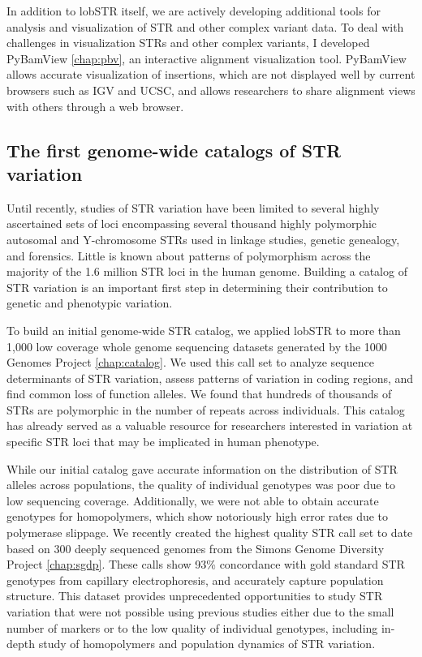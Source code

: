 In addition to lobSTR itself, we are actively developing additional tools for analysis and visualization of STR and other complex variant data. To deal with challenges in visualization STRs and other complex variants, I developed PyBamView \cite{Gymrek2014} \autoref{chap:pbv}, an interactive alignment visualization tool. PyBamView allows accurate visualization of insertions, which are not displayed well by current browsers such as IGV and UCSC, and allows researchers to share alignment views with others through a web browser.

\subsection{The first genome-wide catalogs of STR variation}
Until recently, studies of STR variation have been limited to several highly ascertained sets of loci encompassing several thousand highly polymorphic autosomal and Y-chromosome STRs used in linkage studies, genetic genealogy, and forensics. Little is known about patterns of polymorphism across the majority of the 1.6 million STR loci in the human genome. Building a catalog of STR variation is an important first step in determining their contribution to genetic and phenotypic variation.

To build an initial genome-wide STR catalog, we applied lobSTR to more than 1,000 low coverage whole genome sequencing datasets generated by the 1000 Genomes Project \cite{WillemsGymrekHighnamEtAl2014} \autoref{chap:catalog}. We used this call set to analyze sequence determinants of STR variation, assess patterns of variation in coding regions, and find common loss of function alleles. We found that hundreds of thousands of STRs are polymorphic in the number of repeats across individuals. This catalog has already served as a valuable resource for researchers interested in variation at specific STR loci that may be implicated in human phenotype. 

While our initial catalog gave accurate information on the distribution of STR alleles across populations, the quality of individual genotypes was poor due to low sequencing coverage. Additionally, we were not able to obtain accurate genotypes for homopolymers, which show notoriously high error rates due to polymerase slippage. We recently created the highest quality STR call set to date based on 300 deeply sequenced genomes from the Simons Genome Diversity Project \autoref{chap:sgdp}. These calls show 93\% concordance with gold standard STR genotypes from capillary electrophoresis, and accurately capture population structure. This dataset provides unprecedented opportunities to study STR variation that were not possible using previous studies either due to the small number of markers or to the low quality of individual genotypes, including in-depth study of homopolymers and population dynamics of STR variation.

